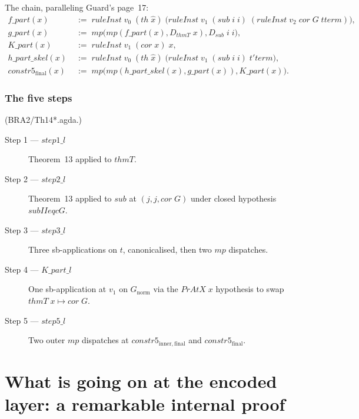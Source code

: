 \documentclass[11pt]{article}
\begin{document}
The chain, paralleling Guard's page~17:
\begin{align*}
  f\_\mathit{part}(x) \;&:=\; \mathit{ruleInst}\;v_0\;(\mathit{th}\;\hat x)\;\big(\mathit{ruleInst}\;v_1\;(\mathit{sub}\;i\;i)\;(\mathit{ruleInst}\;v_2\;\mathit{cor}\;G\;\mathit{tterm})\big),\\
  g\_\mathit{part}(x) \;&:=\; \mathit{mp}\big(\mathit{mp}(f\_\mathit{part}(x), D_{\mathit{thmT}}\;x), D_{\mathit{sub}}\;i\;i\big),\\
  K\_\mathit{part}(x) \;&:=\; \mathit{ruleInst}\;v_1\;(\mathit{cor}\;x)\;x,\\
  h\_\mathit{part}\_\mathit{skel}(x) \;&:=\; \mathit{ruleInst}\;v_0\;(\mathit{th}\;\hat x)\;\big(\mathit{ruleInst}\;v_1\;(\mathit{sub}\;i\;i)\;\mathit{t'term}\big),\\
  \mathit{constr5}_{\mathrm{final}}(x) \;&:=\; \mathit{mp}\big(\mathit{mp}(h\_\mathit{part}\_\mathit{skel}(x), g\_\mathit{part}(x)), K\_\mathit{part}(x)\big).
\end{align*}

\subsubsection{The five steps}

(BRA2/Th14*.agda.)
\begin{description}
  \item[Step 1 --- $\mathit{step1\_l}$] Theorem~13 applied to $\mathit{thmT}$.
  \item[Step 2 --- $\mathit{step2\_l}$] Theorem~13 applied to $\mathit{sub}$ at $(j, j, \mathit{cor}\;G)$ under closed hypothesis $\mathit{subIIeqcG}$.
  \item[Step 3 --- $\mathit{step3\_l}$] Three sb-applications on $t$, canonicalised, then two $\mathit{mp}$ dispatches.
  \item[Step 4 --- $K\_\mathit{part}\_l$] One sb-application at $v_1$ on $G_{\mathrm{norm}}$ via the $\mathit{PrAtX}\;x$ hypothesis to swap $\mathit{thmT}\;x \mapsto \mathit{cor}\;G$.
  \item[Step 5 --- $\mathit{step5\_l}$] Two outer $\mathit{mp}$ dispatches at $\mathit{constr5}_{\mathrm{inner,final}}$ and $\mathit{constr5}_{\mathrm{final}}$.
\end{description}

\section{What is going on at the encoded layer: a remarkable internal proof}
\label{sec:internal}
\end{document}
